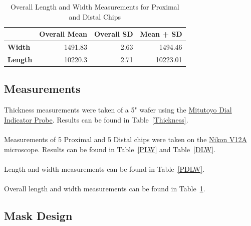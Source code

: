 \documentclass[12pt]{article}
\numberwithin{equation}{section}
\numberwithin{table}{section}
\numberwithin{figure}{section}
\begin{document}
\begin{table}[]
\centering
\caption{Overall Length and Width Measurements for Proximal and Distal Chips}
\label{OPDLW}
\begin{tabular}{@{}lrrr@{}}
\toprule
 & \multicolumn{1}{l}{\textbf{Overall Mean}} & \multicolumn{1}{l}{\textbf{Overall SD}} & \multicolumn{1}{l}{\textbf{Mean + SD}} \\ \midrule
\textbf{Width} & 1491.83 & 2.63 & 1494.46 \\
\textbf{Length} & 10220.3 & 2.71 & 10223.01 \\ \bottomrule
\end{tabular}
\end{table}


\subsection{Measurements}
Thickness measurements were taken of a 5" wafer using the \href{https://coral.nanofab.utah.edu/lab/equipment/show_eq/Mitutoyo+Dial+Indicator+Probe}{Mitutoyo Dial Indicator Probe}. Results can be found in Table~\ref{Thickness}.
\\~\\
Measurements of 5 Proximal and 5 Distal chips were taken on the \href{https://coral.nanofab.utah.edu/lab/equipment/show_eq/Nikon+V12A}{Nikon V12A} microscope. Results can be found in Table~\ref{PLW} and Table~\ref{DLW}.
\\~\\
Length and width measurements can be found in Table~\ref{PDLW}.
\\~\\
Overall length and width measurements can be found in Table~\ref{OPDLW}.

\subsection{Mask Design}

\end{document}
